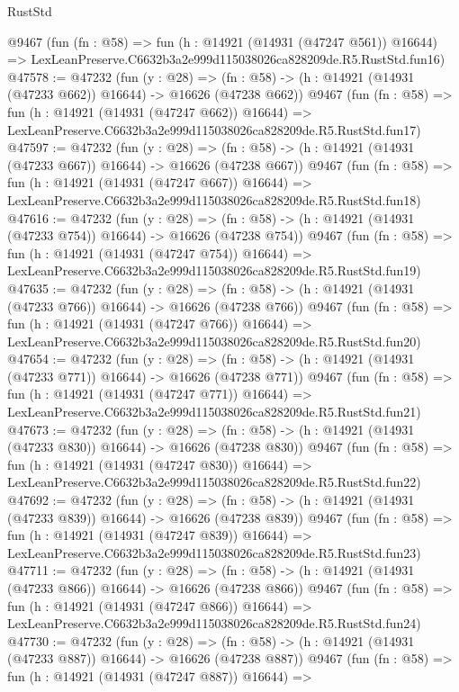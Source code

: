 \begin{lexlean}{RustStd}
\begin{coremodule}
    @9467
    (fun (fn : @58) =>
    fun (h : @14921 (@14931 (@47247 @561)) @16644) =>
    LexLeanPreserve.C6632b3a2e999d115038026ca828209de.R5.RustStd.fun16)
@47578 := @47232
    (fun (y : @28) =>
    (fn : @58) -> (h : @14921 (@14931 (@47233 @662)) @16644) -> @16626 (@47238 @662))
    @9467
    (fun (fn : @58) =>
    fun (h : @14921 (@14931 (@47247 @662)) @16644) =>
    LexLeanPreserve.C6632b3a2e999d115038026ca828209de.R5.RustStd.fun17)
@47597 := @47232
    (fun (y : @28) =>
    (fn : @58) -> (h : @14921 (@14931 (@47233 @667)) @16644) -> @16626 (@47238 @667))
    @9467
    (fun (fn : @58) =>
    fun (h : @14921 (@14931 (@47247 @667)) @16644) =>
    LexLeanPreserve.C6632b3a2e999d115038026ca828209de.R5.RustStd.fun18)
@47616 := @47232
    (fun (y : @28) =>
    (fn : @58) -> (h : @14921 (@14931 (@47233 @754)) @16644) -> @16626 (@47238 @754))
    @9467
    (fun (fn : @58) =>
    fun (h : @14921 (@14931 (@47247 @754)) @16644) =>
    LexLeanPreserve.C6632b3a2e999d115038026ca828209de.R5.RustStd.fun19)
@47635 := @47232
    (fun (y : @28) =>
    (fn : @58) -> (h : @14921 (@14931 (@47233 @766)) @16644) -> @16626 (@47238 @766))
    @9467
    (fun (fn : @58) =>
    fun (h : @14921 (@14931 (@47247 @766)) @16644) =>
    LexLeanPreserve.C6632b3a2e999d115038026ca828209de.R5.RustStd.fun20)
@47654 := @47232
    (fun (y : @28) =>
    (fn : @58) -> (h : @14921 (@14931 (@47233 @771)) @16644) -> @16626 (@47238 @771))
    @9467
    (fun (fn : @58) =>
    fun (h : @14921 (@14931 (@47247 @771)) @16644) =>
    LexLeanPreserve.C6632b3a2e999d115038026ca828209de.R5.RustStd.fun21)
@47673 := @47232
    (fun (y : @28) =>
    (fn : @58) -> (h : @14921 (@14931 (@47233 @830)) @16644) -> @16626 (@47238 @830))
    @9467
    (fun (fn : @58) =>
    fun (h : @14921 (@14931 (@47247 @830)) @16644) =>
    LexLeanPreserve.C6632b3a2e999d115038026ca828209de.R5.RustStd.fun22)
@47692 := @47232
    (fun (y : @28) =>
    (fn : @58) -> (h : @14921 (@14931 (@47233 @839)) @16644) -> @16626 (@47238 @839))
    @9467
    (fun (fn : @58) =>
    fun (h : @14921 (@14931 (@47247 @839)) @16644) =>
    LexLeanPreserve.C6632b3a2e999d115038026ca828209de.R5.RustStd.fun23)
@47711 := @47232
    (fun (y : @28) =>
    (fn : @58) -> (h : @14921 (@14931 (@47233 @866)) @16644) -> @16626 (@47238 @866))
    @9467
    (fun (fn : @58) =>
    fun (h : @14921 (@14931 (@47247 @866)) @16644) =>
    LexLeanPreserve.C6632b3a2e999d115038026ca828209de.R5.RustStd.fun24)
@47730 := @47232
    (fun (y : @28) =>
    (fn : @58) -> (h : @14921 (@14931 (@47233 @887)) @16644) -> @16626 (@47238 @887))
    @9467
    (fun (fn : @58) =>
    fun (h : @14921 (@14931 (@47247 @887)) @16644) =>

\end{coremodule}
\end{lexlean}
